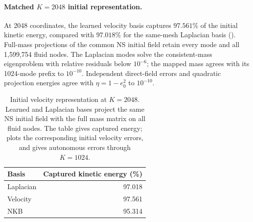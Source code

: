 \begingroup
\paragraph{Matched $K=2048$ initial representation.}
At 2048 coordinates, the learned velocity basis captures $97.561\%$ of the initial kinetic energy, compared with $97.018\%$ for the same-mesh Laplacian basis (). Full-mass projections of the common NS initial field retain every mode and all 1,599,754 fluid nodes. The Laplacian modes solve the consistent-mass eigenproblem with relative residuals below $10^{-6}$; the mapped mass agrees with its 1024-mode prefix to $10^{-10}$. Independent direct-field errors and quadratic projection energies agree with $\eta=1-e_0^2$ to $10^{-10}$.
\begin{table}[!htb]\centering\small
\caption{Initial velocity representation at $K=2048$. Learned and Laplacian bases project the same NS initial field with the full mass matrix on all fluid nodes. The table gives captured energy;  plots the corresponding initial velocity errors, and  gives autonomous errors through $K=1024$.}
\label{tab:initial2048}
\begin{tabular}{lr}\toprule
Basis & Captured kinetic energy (\%)\\\midrule
Laplacian & 97.018\\
Velocity & 97.561\\
NKB & 95.314\\
\bottomrule\end{tabular}\end{table}\par\endgroup
